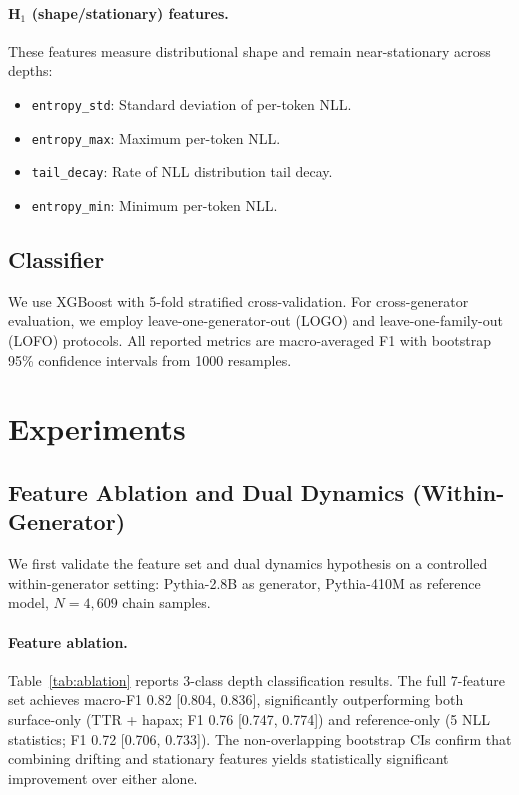 \documentclass[letterpaper]{article}
\begin{document}
\paragraph{H$_1$ (shape/stationary) features.}
These features measure distributional shape and remain near-stationary across depths:
\begin{itemize}
\item \texttt{entropy\_std}: Standard deviation of per-token NLL.
\item \texttt{entropy\_max}: Maximum per-token NLL.
\item \texttt{tail\_decay}: Rate of NLL distribution tail decay.
\item \texttt{entropy\_min}: Minimum per-token NLL.
\end{itemize}

\subsection{Classifier}
We use XGBoost with 5-fold stratified cross-validation.
For cross-generator evaluation, we employ leave-one-generator-out (LOGO) and leave-one-family-out (LOFO) protocols.
All reported metrics are macro-averaged F1 with bootstrap 95\% confidence intervals from 1000 resamples.

\section{Experiments}
\label{sec:experiments}

\subsection{Feature Ablation and Dual Dynamics (Within-Generator)}
\label{sec:ablation}

We first validate the feature set and dual dynamics hypothesis on a controlled within-generator setting: Pythia-2.8B as generator, Pythia-410M as reference model, $N{=}4{,}609$ chain samples.

\paragraph{Feature ablation.}
Table~\ref{tab:ablation} reports 3-class depth classification results.
The full 7-feature set achieves macro-F1 0.82 [0.804, 0.836], significantly outperforming both surface-only (TTR + hapax; F1 0.76 [0.747, 0.774]) and reference-only (5 NLL statistics; F1 0.72 [0.706, 0.733]).
The non-overlapping bootstrap CIs confirm that combining drifting and stationary features yields statistically significant improvement over either alone.
\end{document}
